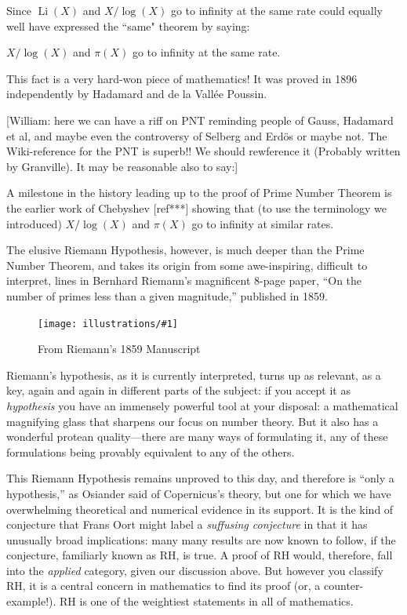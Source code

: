 \documentclass[11pt]{article}
\DeclareMathOperator{\Li}{Li}
\newcommand{\ill}[3]{ 
   \begin{figure}[H]
   \begin{center}
   \texttt{[image: illustrations/\#1]}
   \caption{#3}
   \end{center}
    \end{figure}
}
\theoremstyle{plain}
\theoremstyle{definition}
\numberwithin{equation}{section}
\numberwithin{figure}{section}
\numberwithin{table}{section}
\begin{document}
   Since $\Li(X)$ and $X/\log(X)$ go to infinity at the same rate could
   equally well have expressed the ``same" theorem by saying:

  \vskip10pt
   $X/\log(X)$ and $\pi(X)$ go to infinity at the same rate.
   \vskip10pt
    
   This fact is a very hard-won piece of mathematics!  It was proved
   in 1896 independently by Hadamard and de la Vall\'{e}e Poussin.

   [William: here we can have a riff on PNT reminding people of Gauss,
   Hadamard et al, and maybe even the controversy of Selberg and
   Erd{\"o}s or maybe not. The Wiki-reference for the PNT is superb!!
   We should rewference it (Probably written by Granville).  It may be
   reasonable also to say:]

        \vskip10pt
        
        A milestone in the history leading up to the proof of Prime
        Number Theorem is the earlier work of Chebyshev [ref***]
        showing that (to use the terminology we introduced)
        $X/\log(X)$ and $\pi(X)$ go to infinity at similar rates.
        \vskip15pt

The elusive Riemann Hypothesis, however, is much deeper than the Prime
Number Theorem, and takes its origin from some awe-inspiring,
difficult to interpret, lines in Bernhard Riemann's magnificent 8-page
paper, ``On the number of primes less than a given magnitude,''
published in 1859. 
 

\ill{riemann_zoom}{1}{From Riemann's 1859 Manuscript\label{fig:riemamn}}

Riemann's hypothesis, as it is currently interpreted, turns up as
relevant, as a key, again and again in different parts of the subject:
if you accept it as {\em hypothesis} you have an immensely powerful
tool at your disposal: a mathematical magnifying glass that sharpens
our focus on number theory. But it also has a wonderful protean
quality---there are many ways of formulating it, any of these
formulations being provably equivalent to any of the others.

This Riemann Hypothesis remains unproved to this day, and therefore is
``only a hypothesis,'' as Osiander said of Copernicus's theory, but one
for which we have overwhelming theoretical and numerical evidence in
its support.  It is the kind of conjecture that Frans Oort might label
a {\em suffusing conjecture} in that it has unusually broad
implications: many many results are now known to follow, if the
conjecture, familiarly known as RH, is true. A proof of RH would,
therefore, fall into the {\em applied} category, given our discussion
above.  But however you classify RH, it is a central concern in
mathematics to find its proof (or, a counter-example!).  RH is 
one of the weightiest statements in all of mathematics. 
\end{document}
